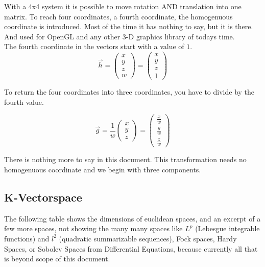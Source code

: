 \documentclass[a4paper]{article}
\begin{document}
\begin{Example}
With a 4x4 system it is possible to move rotation AND translation into one matrix. To reach four coordinates,
a fourth coordinate, the homogenuous coordinate is introduced. Most of the time it has nothing to say, but it
is there. And used for OpenGL and any other 3-D graphics library of todays time.\\

The fourth coordinate in  the vectors start with a value of $1$.\\

\begin{displaymath}
\vec{h} = \begin{pmatrix}x\\y\\z\\w\end{pmatrix} = \begin{pmatrix}x\\y\\z\\1\end{pmatrix} 
\end{displaymath}

To return the four coordinates into three coordinates, you have to divide by the fourth value.

\begin{displaymath}
\vec{g} = \frac{1}{w}\begin{pmatrix}x\\y\\z\end{pmatrix} =\begin{pmatrix}\frac{x}{w}\\\frac{y}{w}\\\frac{z}{w}\end{pmatrix} 
\end{displaymath}

There is nothing more to say in this document. This transformation needs no homogenuous coordinate and we begin with three components.


\subsection{K-Vectorspace}

The following table shows the dimensions of euclidean spaces, and an excerpt of a few more spaces, not showing the many many spaces like $L^{p}$ (Lebesgue integrable functions) and $l^{2}$ (quadratic summarizable sequences), Fock spaces, Hardy Spaces, or Sobolev Spaces from Differential Equations, because currently all that is beyond scope of this document. 


\end{Example}
\end{document}
